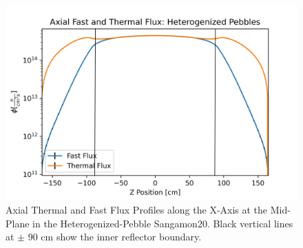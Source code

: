 \begin{figure}[H]
\centering

  \includegraphics[width=0.95\linewidth]{figures/fast_therm_flux_het_zv2.png}

\caption{Axial Thermal and Fast Flux Profiles along the X-Axis at the Mid-Plane in the Heterogenized-Pebble Sangamon20.  Black vertical lines at $\pm$ 90 cm show the inner reflector boundary.}
\label{fig:het-det-z}
\end{figure}
